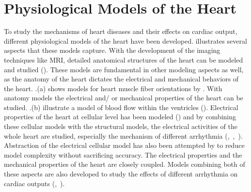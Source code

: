 \section{Physiological Models of the Heart}
To study the mechanisms of heart diseases and their effects on cardiac output, different physiological models of the heart have been developed.  illustrates several aspects that these models capture. With the development of the imaging techniques like MRI, detailed anatomical structures of the heart can be modeled and studied (\cite{geometric}). These models are fundamental in other modeling aspects as well, as the anatomy of the heart dictates the electrical and mechanical behaviors of the heart. .(a) shows models for heart muscle fiber orientations by \cite{fiber}. With anatomy models the electrical and/ or mechanical properties of the heart can be studied. .(b) illustrate a model of blood flow within the ventricles (\cite{bloodflow}). Electrical properties of the heart at cellular level has been modeled (\cite{cellular}) and by combining these cellular models with the structural models, the electrical activities of the whole heart are studied, especially the mechanism of different arrhythmia (\cite{natalia},~\cite{Grosu_MHA},~\cite{Grosu_wave}). Abstraction of the electrical cellular model has also been attempted by \cite{Grosu_abstract} to reduce model complexity without sacrificing accuracy. The electrical properties and the mechanical properties of the heart are closely coupled. Models combining both of these aspects are also developed to study the effects of different arrhythmia on cardiac outputs (\cite{natalia},~\cite{eletro_mechanical}).

